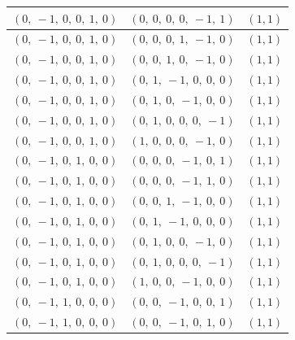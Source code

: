 \documentclass[11pt]{article}
\theoremstyle{definition}
\begin{document}
\begin{longtable}{|l|l|c|}
    \hline
    $\left( 0, \  -1, \  0, \  0, \  1, \  0\right)$ & $\left( 0, \  0, \  0, \  0, \  -1, \  1\right)$ & $(1,1)$ \\
    \hline
    $\left( 0, \  -1, \  0, \  0, \  1, \  0\right)$ & $\left( 0, \  0, \  0, \  1, \  -1, \  0\right)$ & $(1,1)$ \\
    \hline
    $\left( 0, \  -1, \  0, \  0, \  1, \  0\right)$ & $\left( 0, \  0, \  1, \  0, \  -1, \  0\right)$ & $(1,1)$ \\
    \hline
    $\left( 0, \  -1, \  0, \  0, \  1, \  0\right)$ & $\left( 0, \  1, \  -1, \  0, \  0, \  0\right)$ & $(1,1)$ \\
    \hline
    $\left( 0, \  -1, \  0, \  0, \  1, \  0\right)$ & $\left( 0, \  1, \  0, \  -1, \  0, \  0\right)$ & $(1,1)$ \\
    \hline
    $\left( 0, \  -1, \  0, \  0, \  1, \  0\right)$ & $\left( 0, \  1, \  0, \  0, \  0, \  -1\right)$ & $(1,1)$ \\
    \hline
    $\left( 0, \  -1, \  0, \  0, \  1, \  0\right)$ & $\left( 1, \  0, \  0, \  0, \  -1, \  0\right)$ & $(1,1)$ \\
    \hline
    $\left( 0, \  -1, \  0, \  1, \  0, \  0\right)$ & $\left( 0, \  0, \  0, \  -1, \  0, \  1\right)$ & $(1,1)$ \\
    \hline
    $\left( 0, \  -1, \  0, \  1, \  0, \  0\right)$ & $\left( 0, \  0, \  0, \  -1, \  1, \  0\right)$ & $(1,1)$ \\
    \hline
    $\left( 0, \  -1, \  0, \  1, \  0, \  0\right)$ & $\left( 0, \  0, \  1, \  -1, \  0, \  0\right)$ & $(1,1)$ \\
    \hline
    $\left( 0, \  -1, \  0, \  1, \  0, \  0\right)$ & $\left( 0, \  1, \  -1, \  0, \  0, \  0\right)$ & $(1,1)$ \\
    \hline
    $\left( 0, \  -1, \  0, \  1, \  0, \  0\right)$ & $\left( 0, \  1, \  0, \  0, \  -1, \  0\right)$ & $(1,1)$ \\
    \hline
    $\left( 0, \  -1, \  0, \  1, \  0, \  0\right)$ & $\left( 0, \  1, \  0, \  0, \  0, \  -1\right)$ & $(1,1)$ \\
    \hline
    $\left( 0, \  -1, \  0, \  1, \  0, \  0\right)$ & $\left( 1, \  0, \  0, \  -1, \  0, \  0\right)$ & $(1,1)$ \\
    \hline
    $\left( 0, \  -1, \  1, \  0, \  0, \  0\right)$ & $\left( 0, \  0, \  -1, \  0, \  0, \  1\right)$ & $(1,1)$ \\
    \hline
    $\left( 0, \  -1, \  1, \  0, \  0, \  0\right)$ & $\left( 0, \  0, \  -1, \  0, \  1, \  0\right)$ & $(1,1)$ \\

\end{longtable}
\end{document}
